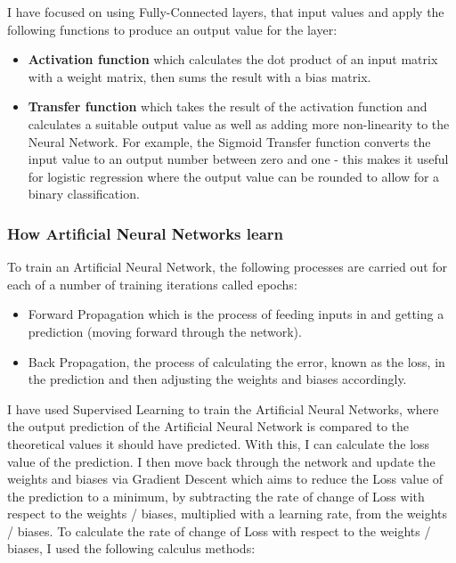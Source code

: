 \documentclass[./project-report/src/latex/project-report.tex]{subfiles}
\begin{document}
I have focused on using Fully-Connected layers, that input values and apply the following functions to produce an output value for the layer:

\begin{itemize}
    \item \textbf{Activation function} which calculates the dot product of an input matrix with a weight matrix, then sums the result with a bias matrix.
    \item \textbf{Transfer function} which takes the result of the activation function and calculates a suitable output value as well as adding more non-linearity to the Neural Network. 
          For example, the Sigmoid Transfer function converts the input value to an output number between zero and one - this makes it useful for logistic regression where the output value 
          can be rounded to allow for a binary classification.
\end{itemize}

\vspace{5mm}

\subsubsection{How Artificial Neural Networks learn}
\vspace{5mm}

To train an Artificial Neural Network, the following processes are carried out for each of a number of training iterations called epochs:

\begin{itemize}
    \item Forward Propagation which is the process of feeding inputs in and getting a prediction (moving forward through the network).
    \item Back Propagation, the process of calculating the error, known as the loss, in the prediction and then adjusting the weights and biases accordingly.
\end{itemize}

I have used Supervised Learning to train the Artificial Neural Networks, where the output prediction of the Artificial Neural Network is compared to the theoretical values it should have 
predicted. With this, I can calculate the loss value of the prediction. I then move back through the network and update the weights and biases via Gradient Descent which aims to reduce 
the Loss value of the prediction to a minimum, by subtracting the rate of change of Loss with respect to the weights / biases, multiplied with a learning rate, from the weights / biases. 
To calculate the rate of change of Loss with respect to the weights / biases, I used the following calculus methods:
\end{document}

